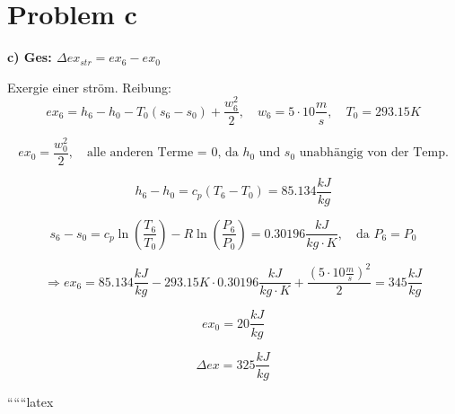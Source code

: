 \section*{Problem c}

\textbf{c) Ges: $\Delta ex_{str} = ex_6 - ex_0$}

Exergie einer ström. Reibung:
\[
ex_6 = h_6 - h_0 - T_0 (s_6 - s_0) + \frac{w_6^2}{2}, \quad w_6 = 5 \cdot 10 \frac{m}{s}, \quad T_0 = 293.15 K
\]

\[
ex_0 = \frac{w_0^2}{2}, \quad \text{alle anderen Terme = 0, da } h_0 \text{ und } s_0 \text{ unabhängig von der Temp.}
\]

\[
h_6 - h_0 = c_p (T_6 - T_0) = 85.134 \frac{kJ}{kg}
\]

\[
s_6 - s_0 = c_p \ln \left( \frac{T_6}{T_0} \right) - R \ln \left( \frac{P_6}{P_0} \right) = 0.30196 \frac{kJ}{kg \cdot K}, \quad \text{da } P_6 = P_0
\]

\[
\Rightarrow ex_6 = 85.134 \frac{kJ}{kg} - 293.15 K \cdot 0.30196 \frac{kJ}{kg \cdot K} + \frac{(5 \cdot 10 \frac{m}{s})^2}{2} = 345 \frac{kJ}{kg}
\]

\[
ex_0 = 20 \frac{kJ}{kg}
\]

\[
\Delta ex = 325 \frac{kJ}{kg}
\]

``````latex